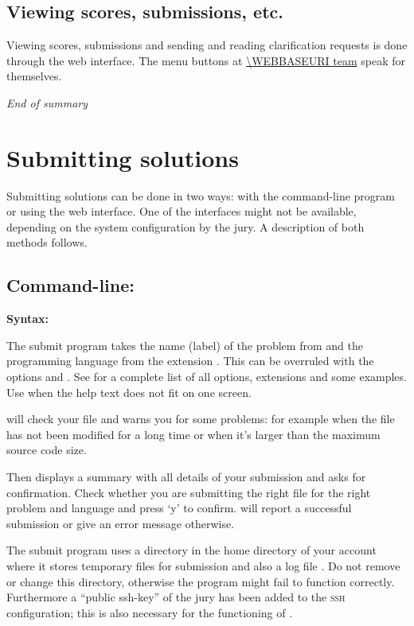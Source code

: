 \subsection*{Viewing scores, submissions, etc.}

Viewing scores, submissions and sending and reading clarification
requests is done through the web interface. The menu buttons at
\url{\WEBBASEURI team} speak for themselves.

\emph{End of summary}

\newpage
\tableofcontents
\newpage

\section{Submitting solutions}\label{submit}

Submitting solutions can be done in two ways: with the command-line
program  or using the web interface. One of the
interfaces might not be available, depending on the system
configuration by the jury. A description of both methods follows.

\subsection{Command-line: }

\textbf{Syntax:} 

The submit program takes the name (label) of the problem from
 and the programming language from the extension
. This can be overruled with the options
 and .
See  for a complete list of all options,
extensions and some examples.  Use 
when the help text does not fit on one screen.

 will check your file and warns you for some problems:
for example when the file has not been modified for a long time or
when it's larger than the maximum source code size.

Then  displays a summary with all details of your
submission and asks for confirmation. Check whether you are submitting
the right file for the right problem and language and press `y' to
confirm.  will report a successful submission or give
an error message otherwise.

The submit program uses a directory \cmd{\USERSUBMITDIR} in the
home directory of your account where it stores temporary files for
submission and also a log file . Do not remove or
change this directory, otherwise the  program might fail to
function correctly. Furthermore a ``public ssh-key'' of the jury has
been added to the \textsc{ssh} configuration; this is also necessary
for the functioning of .

